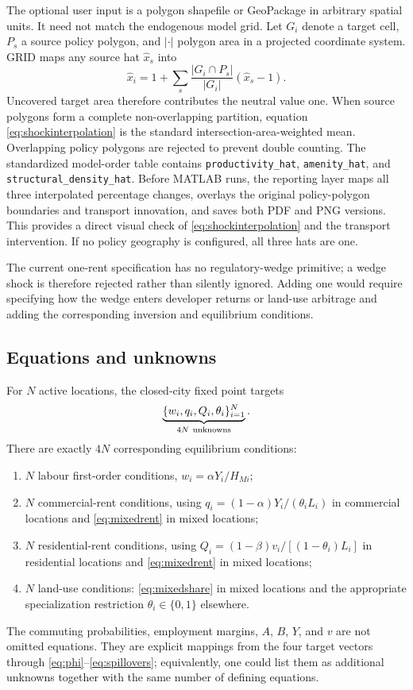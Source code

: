 \documentclass[11pt,a4paper]{article}
\begin{document}
The optional user input is a polygon shapefile or GeoPackage in arbitrary
spatial units. It need not match the endogenous model grid. Let $G_i$ denote a
target cell, $P_s$ a source policy polygon, and $|\cdot|$ polygon area in a
projected coordinate system. GRID maps any source hat $\widehat x_s$ into
\begin{equation}
 \widehat x_i=1+\sum_s
 \frac{|G_i\cap P_s|}{|G_i|}(\widehat x_s-1).          \label{eq:shockinterpolation}
\end{equation}
Uncovered target area therefore contributes the neutral value one. When source
polygons form a complete non-overlapping partition, equation
\eqref{eq:shockinterpolation} is the standard intersection-area-weighted mean.
Overlapping policy polygons are rejected to prevent double counting. The
standardized model-order table contains \texttt{productivity\_hat},
\texttt{amenity\_hat}, and \texttt{structural\_density\_hat}. Before MATLAB
runs, the reporting layer maps all three interpolated percentage changes,
overlays the original policy-polygon boundaries and transport innovation, and
saves both PDF and PNG versions. This provides a direct visual check of
\eqref{eq:shockinterpolation} and the transport intervention. If no policy
geography is configured, all three hats are one.

The current one-rent specification has no regulatory-wedge primitive; a wedge
shock is therefore rejected rather than silently ignored. Adding one would
require specifying how the wedge enters developer returns or land-use arbitrage
and adding the corresponding inversion and equilibrium conditions.

\subsection{Equations and unknowns}
For $N$ active locations, the closed-city fixed point targets
\begin{equation}
 \underbrace{\{w_i,q_i,Q_i,\theta_i\}_{i=1}^N}_{4N\ {\rm unknowns}}. \label{eq:unknowns}
\end{equation}
There are exactly $4N$ corresponding equilibrium conditions:
\begin{enumerate}
\item $N$ labour first-order conditions,
$w_i=\alpha Y_i/H_{Mi}$;
\item $N$ commercial-rent conditions, using
$q_i=(1-\alpha)Y_i/(\theta_iL_i)$ in commercial locations and
\eqref{eq:mixedrent} in mixed locations;
\item $N$ residential-rent conditions, using
$Q_i=(1-\beta)v_i/[(1-\theta_i)L_i]$ in residential locations and
\eqref{eq:mixedrent} in mixed locations;
\item $N$ land-use conditions: \eqref{eq:mixedshare} in mixed locations and
the appropriate specialization restriction $\theta_i\in\{0,1\}$ elsewhere.
\end{enumerate}
The commuting probabilities, employment margins, $A$, $B$, $Y$, and $v$ are
not omitted equations. They are explicit mappings from the four target vectors
through \eqref{eq:phi}--\eqref{eq:spillovers}; equivalently, one could list
them as additional unknowns together with the same number of defining
equations.
\end{document}
